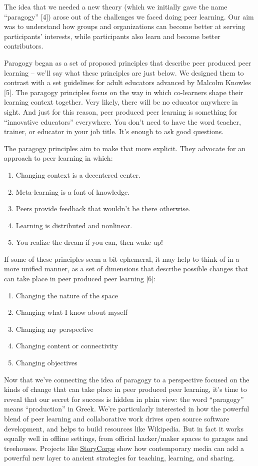 The idea that we needed a new theory (which we initially gave the name
``paragogy'' {[}4{]}) arose out of the challenges we faced doing peer
learning. Our aim was to understand how groups and organizations can
become better at serving participants' interests, while participants
also learn and become better contributors.

Paragogy began as a set of proposed principles that describe peer
produced peer learning -- we'll say what these principles are just
below. We designed them to contrast with a set guidelines for adult
educators advanced by Malcolm Knowles {[}5{]}. The paragogy principles
focus on the way in which co-learners shape their learning context
together. Very likely, there will be no educator anywhere in sight. And
just for this reason, peer produced peer learning is something for
``innovative educators'' everywhere. You don't need to have the word
teacher, trainer, or educator in your job title. It's enough to ask good
questions.

The paragogy principles aim to make that more explicit. They advocate
for an approach to peer learning in which:

\begin{enumerate}
\item
  Changing context is a decentered center.
\item
  Meta-learning is a font of knowledge.
\item
  Peers provide feedback that wouldn't be there otherwise.
\item
  Learning is distributed and nonlinear.
\item
  You realize the dream if you can, then wake up!
\end{enumerate}
If some of these principles seem a bit ephemeral, it may help to think
of in a more unified manner, as a set of dimensions that describe
possible changes that can take place in peer produced peer learning
{[}6{]}:

\begin{enumerate}
\item
  Changing the nature of the space
\item
  Changing what I know about myself
\item
  Changing my perspective
\item
  Changing content or connectivity
\item
  Changing objectives
\end{enumerate}
Now that we've connecting the idea of paragogy to a perspective focused
on the kinds of change that can take place in peer produced peer
learning, it's time to reveal that our secret for success is hidden in
plain view: the word ``paragogy'' means ``production'' in Greek. We're
particularly interested in how the powerful blend of peer learning and
collaborative work drives open source software development, and helps to
build resources like Wikipedia. But in fact it works equally well in
offline settings, from official hacker/maker spaces to garages and
treehouses. Projects like
\href{http://storycorps.org/about/}{StoryCorps} show how contemporary
media can add a powerful new layer to ancient strategies for teaching,
learning, and sharing.

